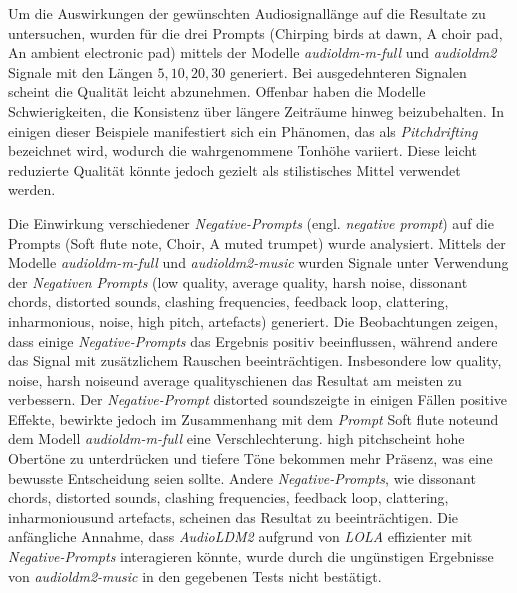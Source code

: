 \documentclass[
  a4paper,  %
  twoside,  %
  bibliography=totoc,
  headsepline,
  cleardoublepage=empty,
  parskip=half,
  draft=false
]{scrbook}
\begin{document}
Um die Auswirkungen der gewünschten Audiosignallänge auf die Resultate zu untersuchen, wurden für die drei Prompts (\glqq Chirping birds at dawn\grqq, \glqq A choir pad\grqq, \glqq An ambient electronic pad\grqq) mittels der Modelle \emph{audioldm-m-full}\cite{noauthor_cvsspaudioldm-m-full_nodate} und \emph{audioldm2}\cite{noauthor_cvsspaudioldm2_nodate} Signale mit den Längen $5,10,20,30$ generiert. Bei ausgedehnteren Signalen scheint die Qualität leicht abzunehmen. Offenbar haben die Modelle Schwierigkeiten, die Konsistenz über längere Zeiträume hinweg beizubehalten. In einigen dieser Beispiele manifestiert sich ein Phänomen, das als \emph{Pitchdrifting} bezeichnet wird, wodurch die wahrgenommene Tonhöhe variiert. Diese leicht reduzierte Qualität könnte jedoch gezielt als stilistisches Mittel verwendet werden.

Die Einwirkung verschiedener \emph{Negative-Prompts} (engl. \emph{negative prompt}) auf die Prompts (\glqq Soft flute note\grqq, \glqq Choir\grqq, \glqq A muted trumpet\grqq) wurde analysiert. Mittels der Modelle \emph{audioldm-m-full}\cite{noauthor_cvsspaudioldm-m-full_nodate} und \emph{audioldm2-music}\cite{noauthor_cvsspaudioldm2-music_nodate} wurden Signale unter Verwendung der \emph{Negativen Prompts} (\glqq low quality\grqq, \glqq average quality\grqq, \glqq harsh noise\grqq, \glqq dissonant chords\grqq, \glqq distorted sounds\grqq, \glqq clashing frequencies\grqq, \glqq feedback loop\grqq, \glqq clattering\grqq, \glqq inharmonious\grqq, \glqq noise\grqq, \glqq high pitch\grqq, \glqq artefacts\grqq) generiert. Die Beobachtungen zeigen, dass einige \emph{Negative-Prompts} das Ergebnis positiv beeinflussen, während andere das Signal mit zusätzlichem Rauschen beeinträchtigen. Insbesondere \glqq low quality\grqq, \glqq noise\grqq, \glqq harsh noise\grqq und \glqq average quality\grqq schienen das Resultat am meisten zu verbessern. Der \emph{Negative-Prompt} \glqq distorted sounds\grqq zeigte in einigen Fällen positive Effekte, bewirkte jedoch im Zusammenhang mit dem \emph{Prompt} \glqq Soft flute note\grqq und dem Modell \emph{audioldm-m-full} eine Verschlechterung. \glqq high pitch\grqq scheint hohe Obertöne zu unterdrücken und tiefere Töne bekommen mehr Präsenz, was eine bewusste Entscheidung seien sollte. Andere \emph{Negative-Prompts}, wie \glqq dissonant chords\grqq, \glqq distorted sounds\grqq, \glqq clashing frequencies\grqq, \glqq feedback loop\grqq, \glqq clattering\grqq, \glqq inharmonious\grqq und \glqq artefacts\grqq, scheinen das Resultat zu beeinträchtigen. Die anfängliche Annahme, dass \emph{AudioLDM2} aufgrund von \emph{LOLA} effizienter mit \emph{Negative-Prompts} interagieren könnte, wurde durch die ungünstigen Ergebnisse von \emph{audioldm2-music} in den gegebenen Tests nicht bestätigt.
\end{document}
